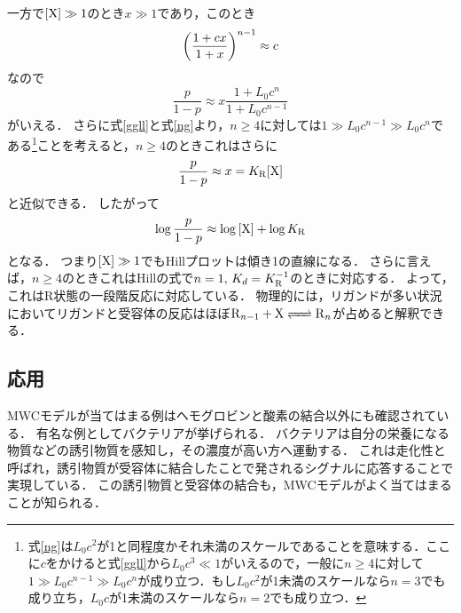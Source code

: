 一方で$[\ce{X}] \gg 1$のとき$x \gg 1$であり，このとき
\begin{equation}
  \qty(\frac{1+cx}{1+x})^{n-1} \approx c
\end{equation}
なので
\begin{equation}
  \frac{p}{1-p} \approx x\frac{1+L_0c^n}{1+L_0c^{n-1}}
\end{equation}
がいえる．
さらに式\eqref{ggll}と式\eqref{ng}より，$n\ge 4$に対しては$1 \gg L_0c^{n-1}  \gg L_0c^{n}$である\footnote{式\eqref{ng}は$L_0c^2$が1と同程度かそれ未満のスケールであることを意味する．ここに$c$をかけると式\eqref{ggll}から$L_0 c^3 \ll 1$がいえるので，一般に$n\ge 4$に対して$1 \gg L_0 c^{n-1} \gg L_0 c^{n}$が成り立つ．もし$L_0c^2$が1未満のスケールなら$n=3$でも成り立ち，$L_0c$が1未満のスケールなら$n=2$でも成り立つ．}ことを考えると，$n \ge 4$のときこれはさらに
\begin{equation}
  \frac{p}{1-p} \approx x = K_{\ce{R}}[\ce{X}] 
\end{equation}
と近似できる．
したがって
\begin{equation}
  \log{\frac{p}{1-p}} \approx  \log{[\ce{X}]} + \log{K_{\ce{R}}} \label{hill_r}
\end{equation}
となる．
つまり$[\ce{X}] \gg 1$でもHillプロットは傾き1の直線になる．
さらに言えば，$n \ge 4$のときこれはHillの式で$n=1,\,K_d=K_{\ce{R}}^{-1}$のときに対応する．
よって，これはR状態の一段階反応に対応している．
物理的には，リガンドが多い状況においてリガンドと受容体の反応はほぼ$\ce{R_{$n-1$} + X <=> R_{$n$}}$が占めると解釈できる．

\subsection{応用}
MWCモデルが当てはまる例はヘモグロビンと酸素の結合以外にも確認されている．
有名な例としてバクテリアが挙げられる．
バクテリアは自分の栄養になる物質などの誘引物質を感知し，その濃度が高い方へ運動する．
これは走化性と呼ばれ，誘引物質が受容体に結合したことで発されるシグナルに応答することで実現している．
この誘引物質と受容体の結合も，MWCモデルがよく当てはまることが知られる．